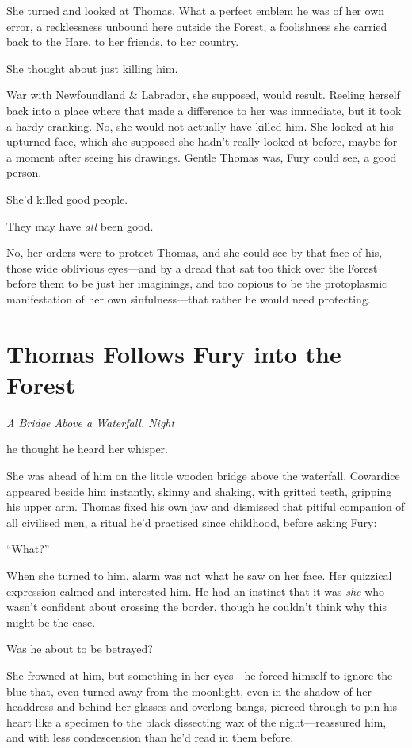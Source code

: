 \documentclass[11pt,a5paper]{article}
\newcommand{\alet}[1]{\textit{#1}\vspace{1em}}
\begin{document}
She turned and looked at Thomas. What a perfect emblem he was of her own error, a recklessness unbound here outside the Forest, a foolishness she carried back to the Hare, to her friends, to her country.

She thought about just killing him.

War with Newfoundland \& Labrador, she supposed, would result. Reeling herself back into a place where that made a difference to her was immediate, but it took a hardy cranking. No, she would not actually have killed him. She looked at his upturned face, which she supposed she hadn't really looked at before, maybe for a moment after seeing his drawings. Gentle Thomas was, Fury could see, a good person.

She'd killed good people.

They may have \emph{all} been good.

No, her orders were to protect Thomas, and she could see by that face of his, those wide oblivious eyes---and by a dread that sat too thick over the Forest before them to be just her imaginings, and too copious to be the protoplasmic manifestation of her own sinfulness---that rather he would need protecting.

\newpage

\section{Thomas Follows Fury into the Forest}

\alet{A Bridge Above a Waterfall, Night}

 he thought he heard her whisper.

She was ahead of him on the little wooden bridge above the waterfall. Cowardice appeared beside him instantly, skinny and shaking, with gritted teeth, gripping his upper arm. Thomas fixed his own jaw and dismissed that pitiful companion of all civilised men, a ritual he'd practised since childhood, before asking Fury:

``What?''

When she turned to him, alarm was not what he saw on her face. Her quizzical expression calmed and interested him. He had an instinct that it was \emph{she} who wasn't confident about crossing the border, though he couldn't think why this might be the case.

Was he about to be betrayed?

She frowned at him, but something in her eyes---he forced himself to ignore the blue that, even turned away from the moonlight, even in the shadow of her headdress and behind her glasses and overlong bangs, pierced through to pin his heart like a specimen to the black dissecting wax of the night---reassured him, and with less condescension than he'd read in them before.
\end{document}
